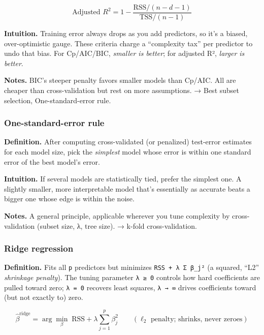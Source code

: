 \documentclass[
  10pt,
  letterpaper,
  onecolumn]{article}
\begin{document}
\begin{equation*}
\text{Adjusted } R^2=1-\frac{\mathrm{RSS}/(n-d-1)}{\mathrm{TSS}/(n-1)}
\end{equation*}

\textbf{Intuition.} Training error always drops as you add predictors,
so it's a biased, over-optimistic gauge. These criteria charge a
``complexity tax'' per predictor to undo that bias. For Cp/AIC/BIC,
\emph{smaller is better}; for adjusted R², \emph{larger is better}.

\textbf{Notes.} BIC's steeper penalty favors smaller models than Cp/AIC.
All are cheaper than cross-validation but rest on more assumptions. →
Best subset selection, One-standard-error rule.

\hypertarget{one-standard-error-rule}{%
\subsubsection{One-standard-error rule}\label{one-standard-error-rule}}

\textbf{Definition.} After computing cross-validated (or penalized)
test-error estimates for each model size, pick the \emph{simplest} model
whose error is within one standard error of the best model's error.

\textbf{Intuition.} If several models are statistically tied, prefer the
simplest one. A slightly smaller, more interpretable model that's
essentially as accurate beats a bigger one whose edge is within the
noise.

\textbf{Notes.} A general principle, applicable wherever you tune
complexity by cross-validation (subset size, λ, tree size). → k-fold
cross-validation.

\hypertarget{ridge-regression}{%
\subsubsection{Ridge regression}\label{ridge-regression}}

\textbf{Definition.} Fits all \texttt{p} predictors but minimizes
\texttt{RSS\ +\ λ\ Σ\ β\_j²} (a squared, ``L2'' \emph{shrinkage
penalty}). The tuning parameter \texttt{λ\ ≥\ 0} controls how hard
coefficients are pulled toward zero; \texttt{λ\ =\ 0} recovers least
squares, \texttt{λ\ →\ ∞} drives coefficients toward (but not exactly
to) zero.

\begin{equation*}
\hat\beta^{\text{ridge}}=\arg\min_\beta\;\mathrm{RSS}+\lambda\sum_{j=1}^{p}\beta_j^2
\qquad (\ell_2\text{ penalty; shrinks, never zeroes})
\end{equation*}
\end{document}
